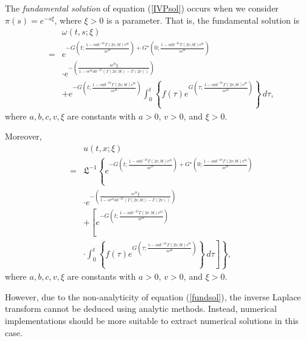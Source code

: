 \documentclass[preprint, 12pt]{elsarticle}
\numberwithin{equation}{section}
\theoremstyle{plain}
\theoremstyle{remark}
\newcommand{\nocomma}{}
\begin{document}
The \textit{fundamental solution} of equation (\ref{IVPsol}) occurs when we consider $\pi (s) = \displaystyle{e^{- s \xi}}$, where $\xi > 0$ is a parameter. That is, the fundamental solution is
\begin{eqnarray}
& & \omega (t, s ; \xi) \label{fundsol} \\
& = & \displaystyle{e^{- G \left( t ; \frac{1 - s a b^{- 2 v} \Gamma (2 v \nocomma, b t) e^{b t}}{s e^{bt}} \right) + G^{\star} \left( 0 ; \frac{1 - s a b^{- 2 v} \Gamma (2 v \nocomma, bt)e^{bt}}{s e^{bt}} \right)}} \nonumber\\
& & \cdot \displaystyle{e^{- \left( \frac{s e^{bt} \xi}{1 - s e^{bt} a b^{- 2 v}  (\Gamma (2 v \nocomma, b t) - \Gamma (2 v \nocomma))} \right)}} \nonumber\\
&  & + \displaystyle{e^{- G \left( t ; \frac{1 - s a b^{- 2 v} \Gamma (2 v \nocomma, b t) e^{b t}}{s e^{bt}} \right)} \int_0^t \left\{ f (\tau) \displaystyle{e^{G \left( \tau ; \frac{1 - s a b^{- 2 v} \Gamma (2 v \nocomma, b t) e^{b t}}{s e^{bt}} \right)}} \right\}\, d \tau} \nonumber, 
\end{eqnarray}
where $a, b, c, v, \xi$ are constants with $a>0$, $v > 0$, and $\xi > 0$.

Moreover,
\begin{eqnarray}
& & u (t, x ; \xi) \label{mainsol}\\ 
& = & \mathfrak{L}^{- 1} \left\{ e^{- G \left( t ; \frac{1 - s a b^{- 2 v} \Gamma (2 v \nocomma, b t) e^{b t}}{s e^{bt}} \right) + G^{\star} \left( 0 ; \frac{1 - s a b^{- 2 v} \Gamma (2 v \nocomma, bt)e^{bt}}{s e^{bt}} \right)} \right. \nonumber\\
& & \cdot e^{- \left( \frac{s e^{bt} \xi}{1 - s e^{bt} a b^{- 2 v}  (\Gamma (2 v \nocomma, b t) - \Gamma (2 v \nocomma))} \right)} \nonumber\\
&  & + \left[e^{- G \left( t ; \frac{1 - s a b^{- 2 v} \Gamma (2 v \nocomma, b t) e^{b t}}{s e^{bt}} \right)}\right. \nonumber\\ 
& & \left. \left. \cdot \int_0^t \left\{ f (\tau) e^{G \left( \tau ; \frac{1 - s a b^{- 2 v} \Gamma (2 v \nocomma, b t) e^{b t}}{s e^{bt}} \right)} \right\}\, d \tau \right] \right\} \nonumber, 
\end{eqnarray}
where $a, b, c, v, \xi$ are constants with $a>0$, $v > 0$, and $\xi > 0$.

However, due to the non-analyticity of equation (\ref{fundsol}), the inverse Laplace transform cannot be deduced using analytic methods. Instead, numerical implementations should be more suitable to extract numerical solutions in this case.
\end{document}
